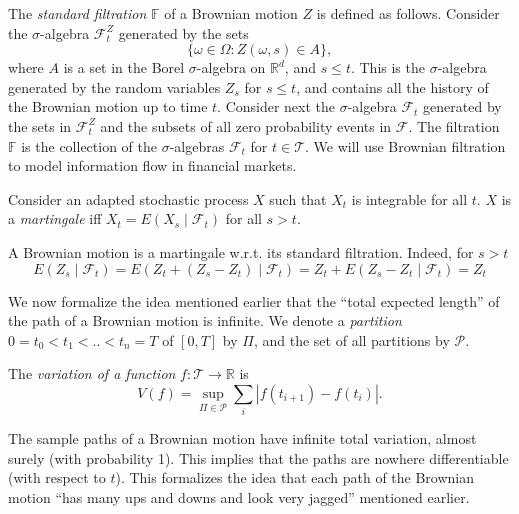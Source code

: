 \documentclass[\topdir/lecture\_notes.tex]{subfiles}
\begin{document}
The \emph{standard filtration} \(\mathbb{F}\) of a Brownian motion \(Z\) is defined as follows. Consider the \(\sigma\)-algebra \(\mathcal{F}_{t}^{Z}\) generated by the sets
\begin{equation*}
\{\omega \in \Omega: Z(\omega, s) \in A\},
\end{equation*}
where \(A\) is a set in the Borel \(\sigma\)-algebra on \(\mathbb{R}^{d}\), and \(s \leq t\). This is the \(\sigma\)-algebra generated by the random variables \(Z_{s}\) for \(s \leq t\), and contains all the history of the Brownian motion up to time \(t\). Consider next the \(\sigma\)-algebra \(\mathcal{F}_{t}\) generated by the sets in \(\mathcal{F}_{t}^{Z}\) and the subsets of all zero probability events in \(\mathcal{F}\). The filtration \(\mathbb{F}\) is the collection of the \(\sigma\)-algebras \(\mathcal{F}_{t}\) for \(t \in \mathcal{T}\). We will use Brownian filtration to model information flow in financial markets.

\begin{defn}[Martingale]\label{defn:martingale}
Consider an adapted stochastic process \(X\) such that \(X_{t}\) is integrable for all \(t\). \(X\) is a \emph{martingale} iff \(X_{t}=E(X_{s} \mid \mathcal{F}_{t})\) for all \(s>t\).
\end{defn}

A Brownian motion is a martingale w.r.t. its standard filtration. Indeed, for \(s>t\)
\begin{equation*}
E(Z_{s} \mid \mathcal{F}_{t})=E(Z_{t}+(Z_{s}-Z_{t}) \mid \mathcal{F}_{t})=Z_{t}+E(Z_{s}-Z_{t} \mid \mathcal{F}_{t})=Z_{t}
\end{equation*}

We now formalize the idea mentioned earlier that the ``total expected length'' of the path of a Brownian motion is infinite. We denote a \emph{partition} \(0=t_{0}<t_{1}<. .<t_{n}=T\) of \([0, T]\) by \(\Pi\), and the set of all partitions by \(\mathcal{P}\).
\begin{defn}\label{defn:variation}
The \emph{variation of a function} \(f: \mathcal{T} \rightarrow \mathbb{R}\) is
\begin{equation*}
V(f)=\sup_{\Pi\in\mathcal{P}} \sum_{i}\left|f\left(t_{i+1}\right)-f\left(t_{i}\right)\right|.
\end{equation*}
\end{defn}
The sample paths of a Brownian motion have infinite total variation, almost surely (with probability 1). This implies that the paths are nowhere differentiable (with respect to \(t\)). This formalizes the idea that each path of the Brownian motion ``has many ups and downs and look very jagged'' mentioned earlier.
\end{document}
